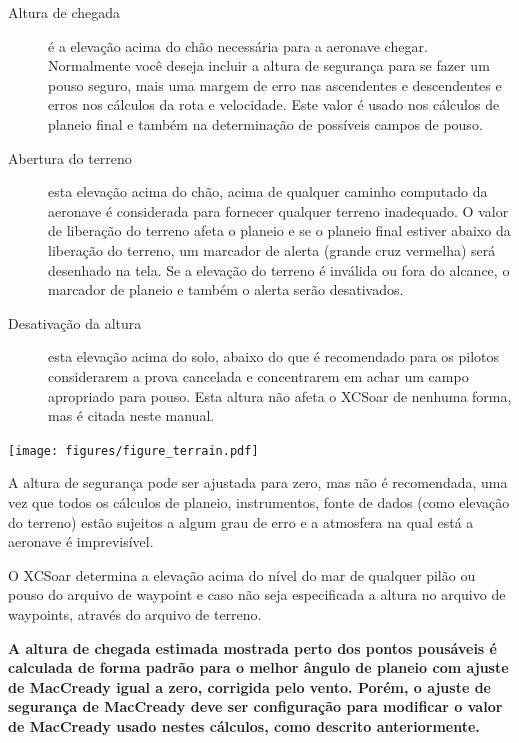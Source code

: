 \begin{description}
\item[Altura de chegada]  é a elevação acima do chão necessária para a aeronave chegar.  Normalmente você deseja incluir a altura de segurança para se fazer um pouso seguro, mais uma margem de erro nas ascendentes e descendentes e erros nos cálculos da rota e velocidade.  Este valor é usado nos cálculos de planeio final e também na determinação de possíveis campos de pouso.  
\item[Abertura do terreno]
 esta elevação acima do chão, acima de qualquer caminho computado da aeronave é considerada para fornecer qualquer terreno inadequado.  O valor de liberação do terreno afeta o planeio e se o planeio final estiver abaixo da liberação do terreno, um marcador de alerta (grande cruz vermelha) será desenhado na tela.  Se a elevação do terreno é inválida ou fora do alcance, o marcador de planeio e também o alerta serão desativados.
\item[Desativação da altura]  esta elevação acima do solo, abaixo do que é recomendado para os pilotos considerarem a prova cancelada e concentrarem em achar um campo apropriado para pouso.  Esta altura não afeta o XCSoar de nenhuma forma, mas é citada neste manual.
\end{description}

\begin{maxipage}
\begin{center}
\texttt{[image: figures/figure\_terrain.pdf]}
\end{center}
\end{maxipage}

\warning
A altura de segurança pode ser ajustada para zero, mas não é recomendada, uma vez que todos os cálculos de planeio, instrumentos, fonte de dados (como elevação do terreno) estão sujeitos a algum grau de erro e a atmosfera na qual está a aeronave é imprevisível.

 O XCSoar determina a elevação acima do nível do mar de qualquer pilão ou pouso do arquivo de waypoint e caso não seja especificada a altura no arquivo de waypoints, através do arquivo de terreno.

\textbf{A altura de chegada estimada mostrada perto dos pontos pousáveis é calculada de forma padrão para o melhor ângulo de planeio com ajuste de MacCready igual a zero, corrigida pelo vento.  Porém, o ajuste de segurança de MacCready deve ser configuração para modificar o valor de MacCready usado nestes cálculos, como descrito anteriormente.}

